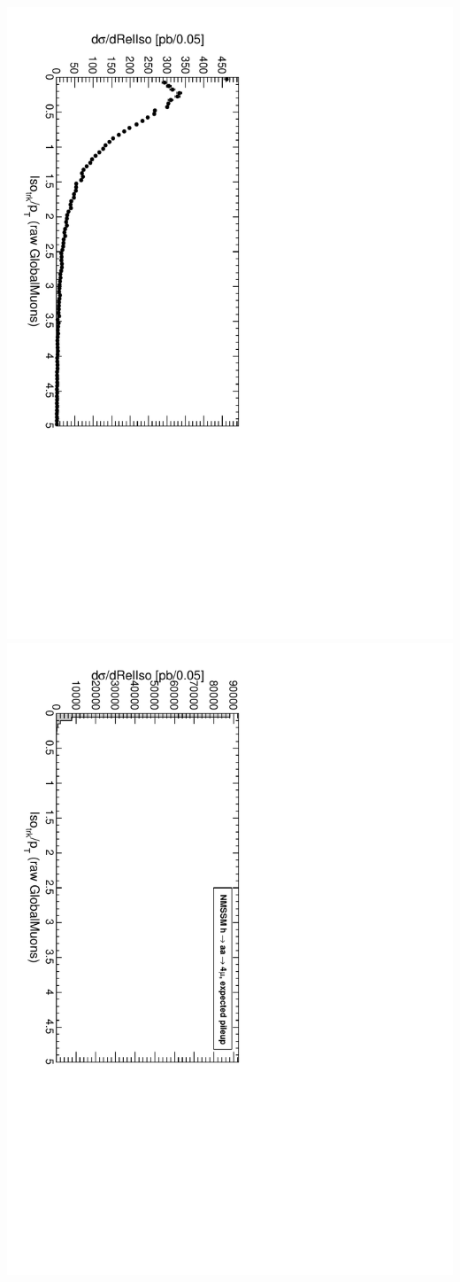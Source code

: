 \documentclass[compress]{beamer}
\begin{document}
\begin{frame}
\includegraphics[height=0.5\linewidth, angle=90]{tkrelisolation_PlainGlobalMuonAny.pdf}
\includegraphics[height=0.5\linewidth, angle=90]{tkrelisolation_PlainGlobalMuonAny_NMSSM.pdf}
\end{frame}
\end{document}
